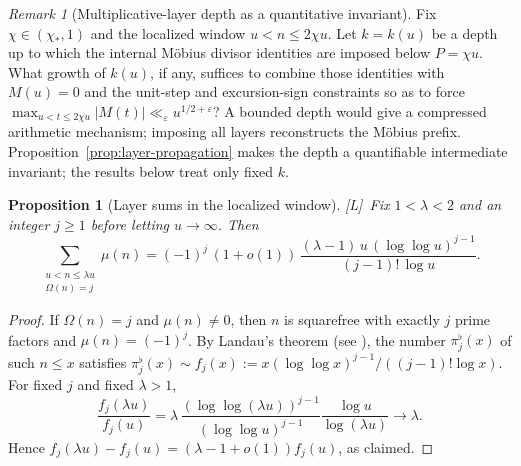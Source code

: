 \documentclass[11pt]{amsart}
\numberwithin{equation}{section}
\theoremstyle{plain}
\newtheorem{proposition}[theorem]{Proposition}
\theoremstyle{definition}
\theoremstyle{remark}
\newtheorem{remark}[theorem]{Remark}
\newcommand{\eps}{\varepsilon}
\newcommand{\tagL}{\textup{[L]}}
\begin{document}
\begin{remark}[Multiplicative-layer depth as a quantitative invariant]
\label{q:layer-depth}
Fix $\chi\in(\chi_*,1)$ and the localized window $u<n\le2\chi u$.
Let $k=k(u)$ be a depth up to which the internal M\"obius divisor identities
are imposed below $P=\chi u$. What growth of $k(u)$, if any, suffices to
combine those identities with $M(u)=0$ and the unit-step and excursion-sign
constraints so as to force
$\max_{u<t\le2\chi u}|M(t)|\ll_\eps u^{1/2+\eps}$? A bounded depth would
give a compressed arithmetic mechanism; imposing all layers reconstructs the
M\"obius prefix. Proposition~\ref{prop:layer-propagation} makes the depth a
quantifiable intermediate invariant; the results below treat only fixed
$k$.
\end{remark}
\begin{proposition}[Layer sums in the localized window]
\label{prop:layer-sums}
\tagL\ Fix $1<\lambda<2$ and an integer $j\ge1$ before letting $u\to\infty$. Then
\begin{equation}
\label{eq:layer-sum}
\sum_{\substack{u<n\le\lambda u\\ \Omega(n)=j}}\mu(n)
=(-1)^j\,(1+o(1))\,\frac{(\lambda-1)\,u\,(\log\log u)^{j-1}}{(j-1)!\,\log u}.
\end{equation}
\end{proposition}

\begin{proof}
If $\Omega(n)=j$ and $\mu(n)\ne0$, then $n$ is squarefree with exactly $j$
prime factors and $\mu(n)=(-1)^j$. By Landau's theorem (see
\cite[Ch.~7]{MontgomeryVaughan2007}), the number $\pi_j^\flat(x)$ of such
$n\le x$ satisfies $\pi_j^\flat(x)\sim f_j(x):=x(\log\log x)^{j-1}/((j-1)!\log x)$.
For fixed $j$ and fixed $\lambda>1$,
\[
\frac{f_j(\lambda u)}{f_j(u)}
=\lambda\,
\frac{(\log\log(\lambda u))^{j-1}}{(\log\log u)^{j-1}}
\frac{\log u}{\log(\lambda u)}\longrightarrow\lambda.
\]
Hence $f_j(\lambda u)-f_j(u)=(\lambda-1+o(1))f_j(u)$, as claimed.
\end{proof}
\end{document}
